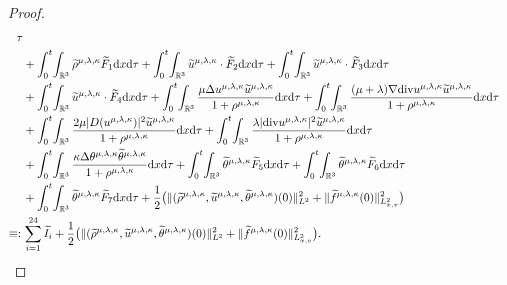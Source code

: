 \documentclass[reqno,11pt]{amsart}
\theoremstyle{plain}
\numberwithin{equation}{section}
\begin{document}
\begin{proof}
\begin{align}
\tau\nonumber\\
&+\int_0^t\!\int_{\mathbb{R}^3} \widetilde{\rho}^{{\mu,\lambda,\kappa}}\widetilde{F}_1 {\rm d}x{\rm d}\tau+\int_0^t\!\int_{\mathbb{R}^3} \widetilde{u}^{{\mu,\lambda,\kappa}}\cdot\widetilde{F}_2 {\rm d}x{\rm d}\tau+\int_0^t\!\int_{\mathbb{R}^3} \widetilde{u}^{{\mu,\lambda,\kappa}}\cdot\widetilde{F}_3 {\rm d}x{\rm d}\tau\nonumber\\
&+\int_0^t\!\int_{\mathbb{R}^3} \widetilde{u}^{{\mu,\lambda,\kappa}}\cdot\widetilde{F}_4 {\rm d}x{\rm d}\tau+\int_0^t\!\int_{\mathbb{R}^3} \frac{\mu\Delta u^{\mu,\lambda,\kappa} \widetilde{u}^{\mu,\lambda,\kappa} }{1+\rho^{\mu,\lambda,\kappa}} {\rm d}x{\rm d}\tau+\int_0^t\!\int_{\mathbb{R}^3} \frac{(\mu+\lambda)\nabla{\rm div} u^{\mu,\lambda,\kappa} \widetilde{u}^{\mu,\lambda,\kappa} }{1+\rho^{\mu,\lambda,\kappa}} {\rm d}x{\rm d}\tau
\nonumber\\
&+\int_0^t\!\int_{\mathbb{R}^3} \frac{2\mu |D(u^{\mu,\lambda,\kappa})|^2 \widetilde{u}^{\mu,\lambda,\kappa} }{1+\rho^{\mu,\lambda,\kappa}} {\rm d}x{\rm d}\tau+\int_0^t\!\int_{\mathbb{R}^3} \frac{\lambda |{\rm div}u^{\mu,\lambda,\kappa}|^2 \widetilde{u}^{\mu,\lambda,\kappa} }{1+\rho^{\mu,\lambda,\kappa}} {\rm d}x{\rm d}\tau\nonumber\\
&+\int_0^t\!\int_{\mathbb{R}^3} \frac{\kappa\Delta \theta^{\mu,\lambda,\kappa} \widetilde{\theta}^{\mu,\lambda,\kappa} }{1+\rho^{\mu,\lambda,\kappa}} {\rm d}x{\rm d}\tau + \int_0^t\!\int_{\mathbb{R}^3} \widetilde{\theta}^{{\mu,\lambda,\kappa}} \widetilde{F}_5 {\rm d}x{\rm d}\tau+ \int_0^t\!\int_{\mathbb{R}^3} \widetilde{\theta}^{{\mu,\lambda,\kappa}} \widetilde{F}_6 {\rm d}x{\rm d}\tau\nonumber\\
&+ \int_0^t\!\int_{\mathbb{R}^3} \widetilde{\theta}^{{\mu,\lambda,\kappa}} \widetilde{F}_7 {\rm d}x{\rm d}\tau  +\frac{1}{2}\big( \|(\widetilde{\rho}^{\mu,\lambda,\kappa},\widetilde{u}^{\mu,\lambda,\kappa},\widetilde\theta^{\mu,\lambda,\kappa})(0)\|_{L^2}^2+  \|\widetilde{f}^{\mu,\lambda,\kappa}(0)\|_{L_{x,v}^2}^2 \big)\nonumber\\
\equiv:\,&\sum_{i=1}^{24}\widetilde{I}_i+\frac{1}{2}\big( \|(\widetilde{\rho}^{\mu,\lambda,\kappa},\widetilde{u}^{\mu,\lambda,\kappa},\widetilde\theta^{\mu,\lambda,\kappa})(0)\|_{L^2}^2+  \|\widetilde{f}^{\mu,\lambda,\kappa}(0)\|_{L_{x,v}^2}^2 \big).
\end{align}


\end{proof}
\end{document}
